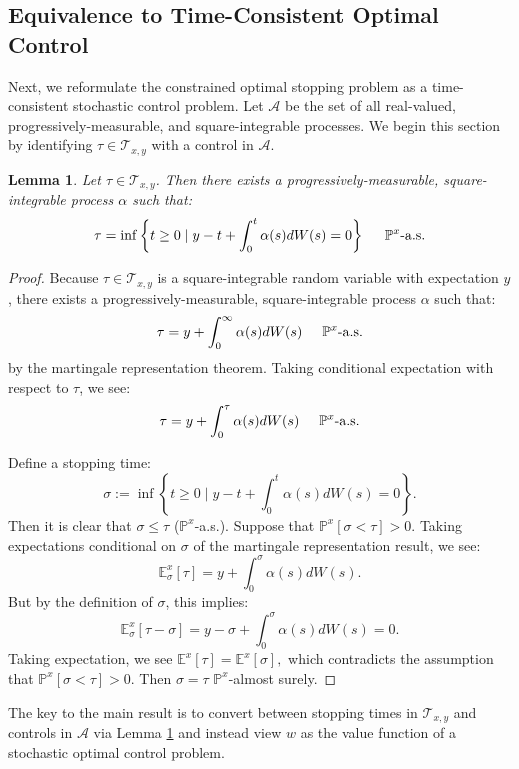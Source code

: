 \documentclass[11pt]{article}
\newtheorem{lem}{Lemma}
\begin{document}
\subsection{Equivalence to Time-Consistent Optimal Control}

Next, we reformulate the constrained optimal stopping problem as a time-consistent stochastic control problem. Let $\mathcal{A}$ be the set of all real-valued, progressively-measurable, and square-integrable processes. We begin this section by identifying $\tau\in\mathcal{T}_{x,y}$ with a control in $\mathcal{A}$.

\begin{lem}\label{Lem:MRT}Let $\tau\in\mathcal{T}_{x,y}$. Then there exists a progressively-measurable, square-integrable process $\alpha$ such that:
\[\tau = \inf\left\{t\geq 0\mid y-t+\int_0^t\alpha(s)dW(s)=0\right\}\hspace{0.5cm}\mathbb{P}^x\text{-a.s.}\]\end{lem}
\begin{proof}
Because $\tau\in\mathcal{T}_{x,y}$ is a square-integrable random variable with expectation $y$, there exists a progressively-measurable, square-integrable process $\alpha$ such that:
\[\tau = y + \int_0^\infty\alpha(s)dW(s)\hspace{0.5cm}\mathbb{P}^x\text{-a.s.}\]
by the martingale representation theorem. Taking conditional expectation with respect to $\tau$, we see:
\[\tau = y + \int_0^\tau\alpha(s)dW(s)\hspace{0.5cm}\mathbb{P}^x\text{-a.s.}\]

Define a stopping time:
\[\sigma:=\inf\left\{t\geq 0\mid y-t+\int_0^t\alpha(s)dW(s)=0\right\}.\]
Then it is clear that $\sigma\leq\tau$ ($\mathbb{P}^x$-a.s.). Suppose that $\mathbb{P}^x\left[\sigma <\tau\right]>0$. Taking expectations conditional on $\sigma$ of the martingale representation result, we see:
\[\mathbb{E}^x_\sigma\left[\tau\right] = y + \int_0^\sigma\alpha(s)dW(s).\]
But by the definition of $\sigma$, this implies:
\[\mathbb{E}^x_\sigma\left[\tau-\sigma\right] = y - \sigma + \int_0^\sigma\alpha(s)dW(s) = 0.\]
Taking expectation, we see $\mathbb{E}^x\left[\tau\right]=\mathbb{E}^x\left[\sigma\right],$ which contradicts the assumption that $\mathbb{P}^x\left[\sigma<\tau\right]>0$. Then $\sigma=\tau$ $\mathbb{P}^x$-almost surely.
\end{proof}

The key to the main result is to convert between stopping times in $\mathcal{T}_{x,y}$ and controls in $\mathcal{A}$ via Lemma \ref{Lem:MRT} and instead view $w$ as the value function of a stochastic optimal control problem.
\end{document}
